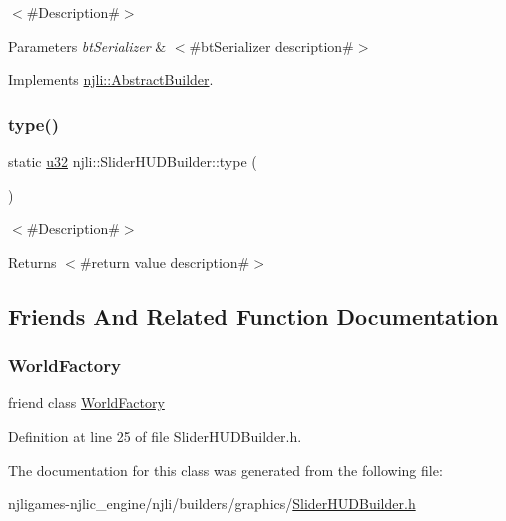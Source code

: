 $<$\#\+Description\#$>$


\begin{DoxyParams}{Parameters}
{\em bt\+Serializer} & $<$\#bt\+Serializer description\#$>$ \\
\hline
\end{DoxyParams}


Implements \mbox{\hyperlink{classnjli_1_1_abstract_builder_ab66b774e02ccb9da554c9aab7fa6d981}{njli\+::\+Abstract\+Builder}}.

\mbox{\label{classnjli_1_1_slider_h_u_d_builder_ad7eb0696e32ce163c3bf7a90b26e3d1f}} 
\subsubsection{\texorpdfstring{type()}{type()}}
{\footnotesize\ttfamily static \mbox{\hyperlink{_util_8h_a10e94b422ef0c20dcdec20d31a1f5049}{u32}} njli\+::\+Slider\+H\+U\+D\+Builder\+::type (\begin{DoxyParamCaption}{ }\end{DoxyParamCaption})\hspace{0.3cm}{\ttfamily [static]}}

$<$\#\+Description\#$>$

\begin{DoxyReturn}{Returns}
$<$\#return value description\#$>$ 
\end{DoxyReturn}


\subsection{Friends And Related Function Documentation}
\mbox{\label{classnjli_1_1_slider_h_u_d_builder_acb96ebb09abe8f2a37a915a842babfac}} 
\subsubsection{\texorpdfstring{World\+Factory}{WorldFactory}}
{\footnotesize\ttfamily friend class \mbox{\hyperlink{classnjli_1_1_world_factory}{World\+Factory}}\hspace{0.3cm}{\ttfamily [friend]}}



Definition at line 25 of file Slider\+H\+U\+D\+Builder.\+h.



The documentation for this class was generated from the following file\+:\begin{DoxyCompactItemize}
\item 
njligames-\/njlic\+\_\+engine/njli/builders/graphics/\mbox{\hyperlink{_slider_h_u_d_builder_8h}{Slider\+H\+U\+D\+Builder.\+h}}\end{DoxyCompactItemize}
